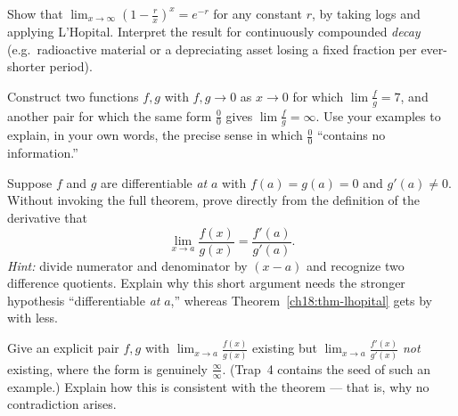 \begin{exercise}
Show that $\displaystyle\lim_{x\to\infty}\left(1-\frac{r}{x}\right)^{x}=e^{-r}$ for any
constant $r$, by taking logs and applying L'Hopital. Interpret the result for
continuously compounded \emph{decay} (e.g.\ radioactive material or a depreciating
asset losing a fixed fraction per ever-shorter period).
\end{exercise}

\begin{exercise}
Construct two functions $f,g$ with $f,g\to 0$ as $x\to 0$ for which
$\lim\tfrac{f}{g}=7$, and another pair for which the same form $\tfrac00$ gives
$\lim\tfrac{f}{g}=\infty$. Use your examples to explain, in your own words, the precise
sense in which $\tfrac00$ ``contains no information.''
\end{exercise}

\begin{exercise}
Suppose $f$ and $g$ are differentiable \emph{at} $a$ with $f(a)=g(a)=0$ and
$g'(a)\neq 0$. Without invoking the full theorem, prove directly from the definition of
the derivative that
\[
\lim_{x\to a}\frac{f(x)}{g(x)}=\frac{f'(a)}{g'(a)}.
\]
\emph{Hint:} divide numerator and denominator by $(x-a)$ and recognize two difference
quotients. Explain why this short argument needs the stronger hypothesis
``differentiable \emph{at} $a$,'' whereas Theorem~\ref{ch18:thm-lhopital} gets by with
less.
\end{exercise}

\begin{exercise}
Give an explicit pair $f,g$ with $\lim_{x\to a}\tfrac{f(x)}{g(x)}$ existing but
$\lim_{x\to a}\tfrac{f'(x)}{g'(x)}$ \emph{not} existing, where the form is genuinely
$\tfrac{\infty}{\infty}$. (Trap~4 contains the seed of such an example.) Explain how
this is consistent with the theorem --- that is, why no contradiction arises.
\end{exercise}
